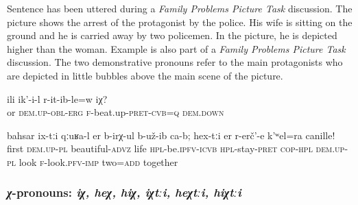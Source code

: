 Sentence  has been uttered during a \textit{Family Problems Picture Task} discussion. The picture shows the arrest of the protagonist by the police. His wife is sitting on the ground and he is carried away by two policemen. In the picture, he is depicted higher than the woman. Example  is also part of a \textit{Family Problems Picture Task} discussion. The two demonstrative pronouns refer to the main protagonists who are depicted in little bubbles above the main scene of the picture.
%
\begin{exe}
	\ex	\label{Or he did beat her?}
	\gll	ili	ik'-i-l	r-it-ib-le=w	iχ?\\
		or	\textsc{dem.up-obl-erg}	\textsc{f}-beat.up-\textsc{pret-cvb=q}	\textsc{dem.down}\\
	\glt	{}

	\ex	\label{It turns out that they lived well in the beginning. Look at them both together!}
	\gll	bahsar	ix-tːi	qːuʁa-l	er	b-irχ-ul	b-už-ib ca-b;	hex-tːi	er	r-erč'-e	k'ʷel=ra	canille!\\
		first	\textsc{dem.up}-\textsc{pl}	beautiful-\textsc{advz}	life	\textsc{hpl}-be.\textsc{ipfv}-\textsc{icvb}	\textsc{hpl}-stay-\textsc{pret} \textsc{cop-hpl}	\textsc{dem.up}-\textsc{pl}	look	\textsc{f}-look.\textsc{pfv-im}\textsc{p}	two=\textsc{add}	together\\
	\glt	{}
\end{exe}



\subsubsection{\textit{χ}-pronouns: \textit{iχ, heχ, hiχ, iχtːi, heχtːi, hiχtːi}}
\label{sssec:x-pronouns}

